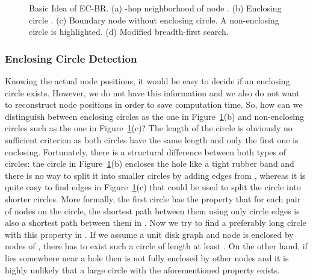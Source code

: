 \documentclass{llncs}
\begin{document}
\begin{figure}[t]
\centering
\hfill
{}
\hfill
{}
\hfill
{}
\hfill
{}
\hfill{}
\caption{Basic Idea of EC-BR. (a) -hop neighborhood of node . (b) Enclosing circle . (c) Boundary node without enclosing circle. A non-enclosing circle is highlighted. 
(d) Modified breadth-first search.}
\label{fig::ecbr_idea}
\end{figure}


\subsubsection{Enclosing Circle Detection}
Knowing the actual node positions, it would be easy to decide if an enclosing circle exists.
However, we do not have this information and we also do not want to reconstruct node positions in order to save computation time.
So, how can we distinguish between enclosing circles as the one in Figure~\ref{fig::ecbr_idea}(b) and non-enclosing circles such as the one in Figure~\ref{fig::ecbr_idea}(c)?
The length of the circle is obviously no sufficient criterion as both circles have the same length and only the first one is enclosing.
Fortunately, there is a structural difference between both types of circles: the circle in Figure~\ref{fig::ecbr_idea}(b) encloses the hole like a tight rubber band and there is no way to split it into smaller circles by adding edges from , whereas it is quite easy to find edges in Figure~\ref{fig::ecbr_idea}(c) that could be used to split the circle into shorter circles.
More formally, the first circle has the property that for each pair  of nodes on the circle, the shortest path between them using only circle edges is also a shortest path between them in .
Now we try to find a preferably long circle with this property in .
If we assume a unit disk graph and node  is enclosed by nodes of  , there has to exist such a circle of length at least .
On the other hand, if  lies somewhere near a hole then  is not fully enclosed by other nodes and it is highly unlikely that a large circle with the aforementioned property exists.
\end{document}
